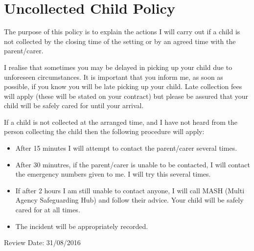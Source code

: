 

\section{Uncollected Child Policy}

The purpose of this policy is to explain the actions I will carry out if
a child is not collected by the closing time of the setting or by an
agreed time with the parent/carer.

I realise that sometimes you may be delayed in picking up your child due
to unforeseen circumstances. It is important that you inform me, as soon
as possible, if you know you will be late picking up your child. Late
collection fees will apply (these will be stated on your contract) but
please be assured that your child will be safely cared for until your
arrival.

If a child is not collected at the arranged time, and I have not heard
from the person collecting the child then the following procedure will
apply:

\begin{itemize}
\item
  After 15 minutes I will attempt to contact the parent/carer several
  times.~
\item
  After 30 minutres, if the parent/carer is unable to be contacted, I
  will contact the emergency numbers given to me. I will try this
  several times.~
\item
  If after 2 hours I am still unable to contact anyone, I will call
  MASH (Multi Agency Safeguarding Hub) and follow their advice. Your
  child will be safely cared for at all times. ~
\item
  The incident will be appropriately recorded.~
\end{itemize}

Review Date: 31/08/2016


